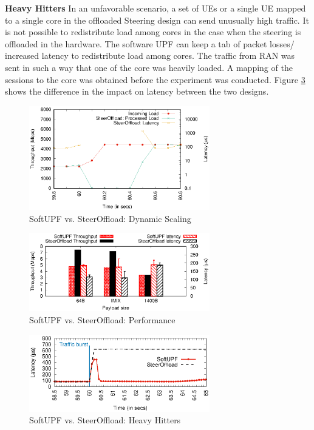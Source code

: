 \textbf{Heavy Hitters} In an unfavorable scenario, a set of UEs or  a single UE mapped
to a single core in the offloaded Steering design can send unusually high traffic. It
is not possible to redistribute load among cores in the case when the steering is
offloaded in the hardware. The software UPF can keep a tab of packet losses/
increased latency to redistribute load among cores. The traffic from RAN was sent in such a way that one of the core was heavily loaded. A  mapping of the sessions to the core was obtained before the experiment was conducted.
Figure \ref{fig:HeavyHitter} shows the difference in the  impact on latency between the  two designs.
\begin{figure}[htbp]
	\centering
	\includegraphics[width=0.7\textwidth]{fig/dynScaling_SteerOffload.eps}
	\setlength{\belowcaptionskip}{-12pt}
	\caption{SoftUPF vs. SteerOffload: Dynamic Scaling}
	\label{fig:dynamicScaling}
\end{figure}
\begin{figure}[htbp]
	\centering
	\includegraphics[width=0.7\textwidth]{fig/pipelineVsRTT.eps}
	\setlength{\belowcaptionskip}{-12pt}

	\caption{SoftUPF vs. SteerOffload: Performance}

	\label{fig:UPFABperformance}
\end{figure}
\begin{figure}[htbp]
	\centering
	\includegraphics[width=0.7\textwidth]{fig/heavyHitter.eps}
	\setlength{\belowcaptionskip}{-12pt}
	\caption{SoftUPF vs. SteerOffload: Heavy Hitters}
	\label{fig:HeavyHitter}
\end{figure}

